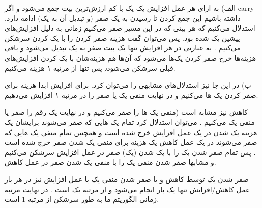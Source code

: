 الف)
به ازای هر عمل افزایش یک یک با کم ارزش‌ترین بیت جمع می‌شود و اگر 
carry 
داشته باشیم این جمع کردن تا رسیدن به یک صفر 
(و تبدیل آن به یک)
ادامه دارد.
استدلال می‌کنیم که هر بیتی که در این مسیر صفر می‌کنیم زمانی به دلیل افزایش‌های پیشین یک شده بود.
پس می‌توان گفت هزینه صفر کردن را با یک کردن سرشکن می‌کنیم
.
به عبارتی در هر افزایش تنها یک بیت صفر به یک تبدیل می‌شود
و باقی هزینه‌ها خرج صفر کردن یک‌ها می‌شود که آن‌ها هم هزینه‌شان با 
یک کردن‌ افزایش‌های قبلی سرشکن می‌شود٫
پس تنها از مرتبه ۱ هزینه می‌کنیم.

ب)
در این جا نیز استدلال‌های مشابهی را می‌توان کرد.
برای افزایش ابدا هزینه برای صفر کردن یک ها 
می‌کنیم و در نهایت 
منفی یک یا صفر را در مرتبه ۱ افزایش می‌دهیم.

کاهش نیز مشابه است 
(منفی یک ها را صفر می‌کنیم و در نهایت یک رقم را صفر یا منفی یک می‌کنیم
.
می‌توان استدلال کرد تمام یک هایی که صفر می‌شوند برایشان یک هزینه یک شدن در یک عمل افزایش خرج شده است
و همچنین تمام منفی یک هایی که صفر می‌شوند در یک عمل کاهش یک هزینه برای منفی یک شدن صفر خرج شده است
.
پس تمام صفر شدن یک را با یک شدن (یک) صفر در عمل افزایش سرشکن می‌کنیم 
و مشابها صفر شدن منفی یک را با منفی یک شدن صفر در عمل کاهش.

صفر شدن یک توسط کاهش و یا صفر شدن منفی یک با عمل افزایش نیز در هر بار عمل کاهش/افزایش تنها یک بار انجام می‌شود و از مرتبه یک است
.
در نهایت مرتبه زمانی الگوریتم ما به طور سرشکن از مرتبه 
1 
است.